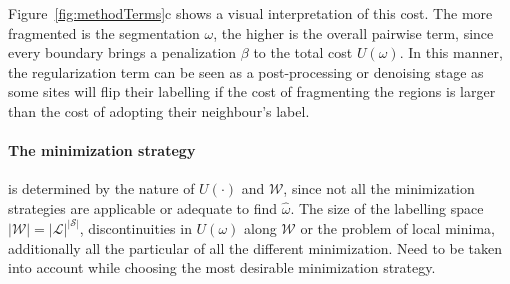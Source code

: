Figure~\ref{fig:methodTerms}c shows a visual interpretation of this cost.
The more fragmented is the segmentation $\omega$, the higher is the overall pairwise term, since every boundary brings a penalization $\beta$ to the total cost $U(\omega)$.
In this manner, the regularization term can be seen as a post-processing or denoising stage as some sites will flip their labelling if the cost of fragmenting the regions is larger than the cost of adopting their neighbour's label.


\paragraph{The minimization strategy} \label{sec:method:min}
is determined by the nature of $U(\cdot)$ and $\mathcal{W}$, since not all the minimization strategies are applicable or adequate to find $\hat{\omega}$.
The size of the labelling space $|\mathcal{W}|=|\mathcal{L}|^{|\mathcal{S}|}$, discontinuities in $U(\omega)$ along $\mathcal{W}$ or the problem of local minima,
additionally all the particular of all the different minimization.
Need to be taken into account while choosing the most desirable minimization strategy.

